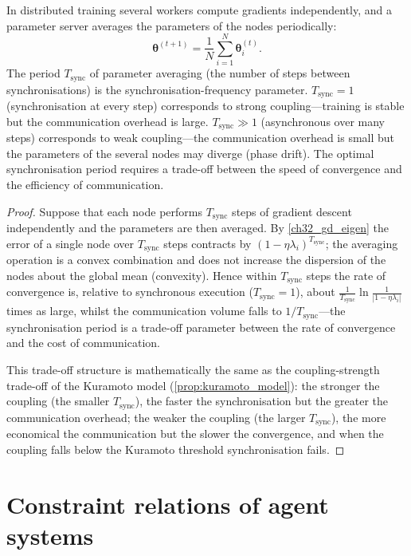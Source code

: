 \begin{proposition}\label{prop:parameter_averaging}
In distributed training several workers compute gradients independently, and a parameter server averages the parameters of the nodes periodically:
\[
\boldsymbol{\theta}^{(t+1)} = \frac{1}{N} \sum_{i=1}^{N} \boldsymbol{\theta}_i^{(t)}.
\]
The period $T_{\text{sync}}$ of parameter averaging (the number of steps between synchronisations) is the synchronisation-frequency parameter. $T_{\text{sync}} = 1$ (synchronisation at every step) corresponds to strong coupling---training is stable but the communication overhead is large. $T_{\text{sync}} \gg 1$ (asynchronous over many steps) corresponds to weak coupling---the communication overhead is small but the parameters of the several nodes may diverge (phase drift). The optimal synchronisation period requires a trade-off between the speed of convergence and the efficiency of communication.
\end{proposition}

\begin{proof}
Suppose that each node performs $T_{\text{sync}}$ steps of gradient descent independently and the parameters are then averaged. By \cref{ch32_gd_eigen} the error of a single node over $T_{\text{sync}}$ steps contracts by $(1-\eta\lambda_i)^{T_{\text{sync}}}$; the averaging operation is a convex combination and does not increase the dispersion of the nodes about the global mean (convexity). Hence within $T_{\text{sync}}$ steps the rate of convergence is, relative to synchronous execution ($T_{\text{sync}}=1$), about $\frac{1}{T_{\text{sync}}}\ln\frac{1}{|1-\eta\lambda_i|}$ times as large, whilst the communication volume falls to $1/T_{\text{sync}}$---the synchronisation period is a trade-off parameter between the rate of convergence and the cost of communication.

This trade-off structure is mathematically the same as the coupling-strength trade-off of the Kuramoto model (\cref{prop:kuramoto_model}): the stronger the coupling (the smaller $T_{\text{sync}}$), the faster the synchronisation but the greater the communication overhead; the weaker the coupling (the larger $T_{\text{sync}}$), the more economical the communication but the slower the convergence, and when the coupling falls below the Kuramoto threshold synchronisation fails.
\end{proof}

\section{Constraint relations of agent systems}

